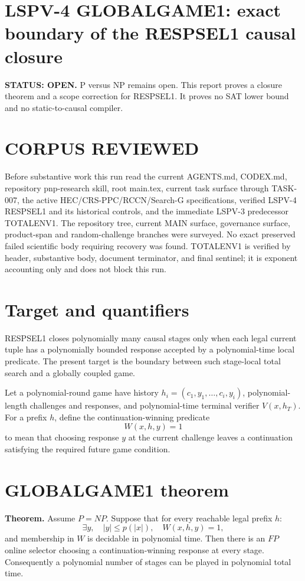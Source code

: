 \documentclass[11pt]{article}
\begin{document}
\section*{LSPV-4 GLOBALGAME1: exact boundary of the RESPSEL1 causal closure}
\textbf{STATUS: OPEN.} P versus NP remains open. This report proves a closure theorem and a scope correction for RESPSEL1. It proves no SAT lower bound and no static-to-causal compiler.

\section*{CORPUS REVIEWED}
Before substantive work this run read the current AGENTS.md, CODEX.md, repository pnp-research skill, root main.tex, current task surface through TASK-007, the active HEC/CRS-PPC/RCCN/Search-G specifications, verified LSPV-4 RESPSEL1 and its historical controls, and the immediate LSPV-3 predecessor TOTALENV1. The repository tree, current MAIN surface, governance surface, product-span and random-challenge branches were surveyed. No exact preserved failed scientific body requiring recovery was found. TOTALENV1 is verified by header, substantive body, document terminator, and final sentinel; it is exponent accounting only and does not block this run.

\section*{Target and quantifiers}
RESPSEL1 closes polynomially many causal stages only when each legal current tuple has a polynomially bounded response accepted by a polynomial-time local predicate. The present target is the boundary between such stage-local total search and a globally coupled game.

Let a polynomial-round game have history \(h_i=(c_1,y_1,\ldots,c_i,y_i)\), polynomial-length challenges and responses, and polynomial-time terminal verifier \(V(x,h_T)\). For a prefix \(h\), define the continuation-winning predicate
\[
W(x,h,y)=1
\]
to mean that choosing response \(y\) at the current challenge leaves a continuation satisfying the required future game condition.

\section*{GLOBALGAME1 theorem}
\textbf{Theorem.} Assume \(P=NP\). Suppose that for every reachable legal prefix \(h\):
\[
\exists y,\quad |y|\le p(|x|),\quad W(x,h,y)=1,
\]
and membership in \(W\) is decidable in polynomial time. Then there is an \(FP\) online selector choosing a continuation-winning response at every stage. Consequently a polynomial number of stages can be played in polynomial total time.
\end{document}
